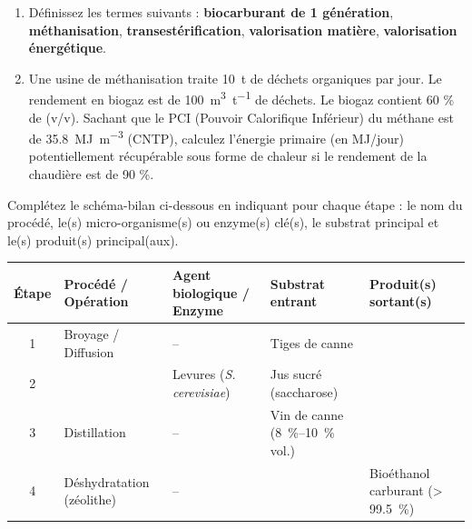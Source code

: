 \documentclass[11pt]{article}
\newcounter{popsec}
\newcounter{popsub}
\newcommand{\courssub}[1]{%
  \stepcounter{popsub}%
  \par\vspace{9pt}\noindent{\popxbold\fontsize{11.5}{13}\selectfont\color{popink}{\color{poporange}\thepopsec.\thepopsub}\hspace{6pt}#1}\par\nopagebreak\vspace{4pt}
}
\begin{document}
\begin{exercice}
\begin{enumerate}
    \item Définissez les termes suivants : \textbf{biocarburant de 1 génération}, \textbf{méthanisation}, \textbf{transestérification}, \textbf{valorisation matière}, \textbf{valorisation énergétique}.
    \item Une usine de méthanisation traite \SI{10}{\tonne} de déchets organiques par jour. Le rendement en biogaz est de \SI{100}{\cubic\meter\per\tonne} de déchets. Le biogaz contient 60 \% de  (v/v). Sachant que le PCI (Pouvoir Calorifique Inférieur) du méthane est de \SI{35,8}{\mega\joule\per\cubic\meter} (CNTP), calculez l'énergie primaire (en MJ/jour) potentiellement récupérable sous forme de chaleur si le rendement de la chaudière est de 90 \%. 
\end{enumerate}
\end{exercice}

\begin{exercice}
Complétez le schéma-bilan ci-dessous en indiquant pour chaque étape : le nom du procédé, le(s) micro-organisme(s) ou enzyme(s) clé(s), le substrat principal et le(s) produit(s) principal(aux).
\begin{center}
\begin{tabularx}{\linewidth}{|c|X|X|X|X|}\hline
\textbf{Étape} & \textbf{Procédé / Opération} & \textbf{Agent biologique / Enzyme} & \textbf{Substrat entrant} & \textbf{Produit(s) sortant(s)} \\ \hline
1 & Broyage / Diffusion & -- & Tiges de canne &  \\ \hline
2 &  & Levures (\emph{S. cerevisiae}) & Jus sucré (saccharose) &  \\ \hline
3 & Distillation & -- & Vin de canne (\SIrange{8}{10}{\percent} vol.) &  \\ \hline
4 & Déshydratation (zéolithe) & -- &  & Bioéthanol carburant (> \SI{99,5}{\percent}) \\ \hline
\end{tabularx}
\end{center}
\end{exercice}

\courssub{Je m'entraîne}
\end{document}
